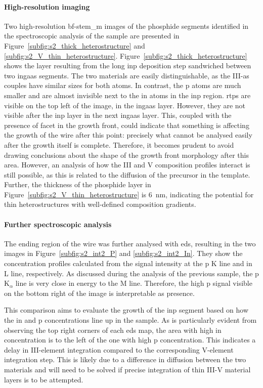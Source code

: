 \paragraph{High-resolution imaging} Two high-resolution \acs{bf}-\acs{stem_m} images of the phosphide segments identified in the spectroscopic analysis of the sample are presented in Figure~\ref{subfig:s2_thick_heterostructure} and \ref{subfig:s2_V_thin_heterostructure}. Figure~\ref{subfig:s2_thick_heterostructure} shows the layer resulting from the long \acs{inp} deposition step sandwiched between two \acs{ingaas} segments. The two materials are easily distinguishable, as the III-\acs{as} couples have similar sizes for both atoms. In contrast, the \acl{p} atoms are much smaller and are almost invisible next to the \acl{in} atoms in the \acs{inp} region. \acl{rtp}s are visible on the top left of the image, in the \acs{ingaas} layer. However, they are not visible after the \acs{inp} layer in the next \acs{ingaas} layer. This, coupled with the presence of  facet in the growth front, could indicate that something is affecting the growth of the wire after this point: precisely what cannot be analysed easily after the growth itself is complete. Therefore, it becomes prudent to avoid drawing conclusions about the shape of the growth front morphology after this area. However, an analysis of how the III and V composition profiles interact is still possible, as this is related to the diffusion of the precursor in the template. Further, the thickness of the phosphide layer in Figure~\ref{subfig:s2_V_thin_heterostructure} is \qty{6}{nm}, indicating the potential for thin heterostructures with well-defined composition gradients. 

\paragraph{Further spectroscopic analysis} The ending region of the wire was further analysed with \acs{eds}, resulting in the two images in Figure~\ref{subfig:s2_int2_P} and \ref{subfig:s2_int2_In}. They show the concentration profiles calculated from the signal intensity at the \acl{p} K line and \acl{in} L line, respectively. As discussed during the analysis of the previous sample, the \acl{p} K\(_\alpha\) line is very close in energy to the  M line. Therefore, the high \acl{p} signal visible on the bottom right of the image is interpretable as  presence. 

This comparison aims to evaluate the growth of the \acs{inp} segment based on how the \acl{in} and \acl{p} concentrations line up in the sample. As is particularly evident from observing the top right corners of each \acs{eds} map, the area with high \acl{in} concentration is to the left of the one with high \acl{p} concentration. This indicates a delay in III-element integration compared to the corresponding V-element integration step. This is likely due to a difference in diffusion between the two materials and will need to be solved if precise integration of thin III-V material layers is to be attempted.

